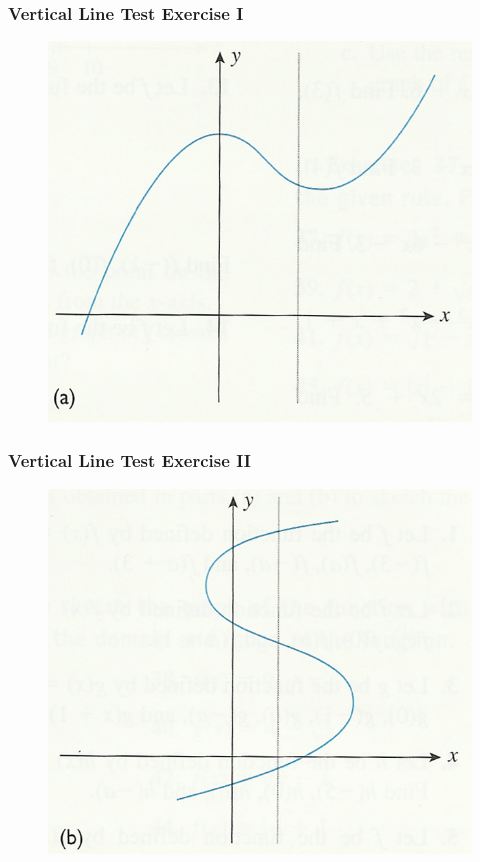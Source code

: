 \documentclass[xcolor=dvipsnames]{beamer}
\begin{document}
\begin{frame}
  \frametitle{Vertical Line Test Exercise I}
  \begin{figure}[h]
    \includegraphics[scale=1]{./vertical-01.png}
  \end{figure}
\end{frame}

\begin{frame}
  \frametitle{Vertical Line Test Exercise II}
  \begin{figure}[h]
    \includegraphics[scale=1]{./vertical-02.png}
  \end{figure}
\end{frame}
\end{document}
